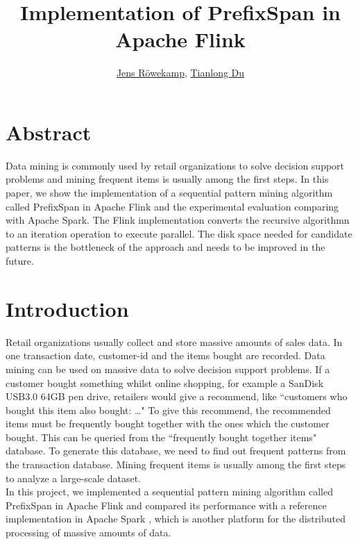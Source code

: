 \documentclass[a4paper,10pt,twocolumn]{article}
\author{\href{mailto:j.roewekamp@campus.tu-berlin.de}{Jens Röwekamp}, \href{mailto:du_tianlong@hotmail.com}{Tianlong Du}}
\title{Implementation of PrefixSpan in Apache Flink}
\begin{document}
\maketitle

\section*{Abstract}
Data mining is commonly used by retail organizations to solve decision support problems and mining frequent items is usually among the first steps. In this paper, we show the implementation of a sequential pattern mining algorithm called PrefixSpan in Apache Flink and the experimental evaluation comparing with Apache Spark. The Flink implementation converts the recursive algorithmn to an iteration operation to execute parallel. The disk space needed for candidate patterns is the bottleneck of the approach and needs to be improved in the future.

\section{Introduction}


Retail organizations usually collect and store massive amounts of sales data. In one transaction date, customer-id and the items bought are recorded. Data mining can be used on massive data to solve decision support problems. If a customer bought something whilst online shopping, for example a SanDisk USB3.0 64GB pen drive, retailers would give a recommend, like ``customers who bought this item also bought: \dots" To give this recommend, the recommended items must be frequently bought together with the ones which the customer bought. This can be queried from the ``frequently bought together items" database. To generate this database, we need to find out frequent patterns from the transaction database. Mining frequent items is usually among the first steps to analyze a large-scale dataset. \\
In this project, we implemented a sequential pattern mining algorithm called PrefixSpan \cite{PrefixSpan} in Apache Flink \cite{Flink} and compared its performance with a reference implementation in Apache Spark \cite{Spark}, which is another platform for the distributed processing of massive amounts of data.
\end{document}
